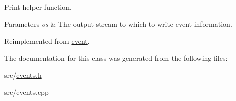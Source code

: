 Print helper function. 


\begin{DoxyParams}{Parameters}
{\em os} & The output stream to which to write event information. \\
\hline
\end{DoxyParams}


Reimplemented from \hyperlink{classevent_a14ef1b59ef1f5a8311c7cac315c271df}{event}.



The documentation for this class was generated from the following files\-:\begin{DoxyCompactItemize}
\item 
src/\hyperlink{events_8h}{events.\-h}\item 
src/events.\-cpp\end{DoxyCompactItemize}
